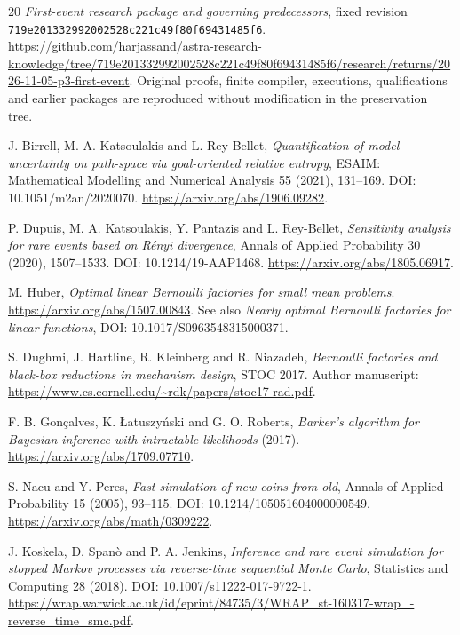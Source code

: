 \documentclass[10pt,a4paper]{article}
\begin{document}
\begin{thebibliography}{20}
\emph{First-event research package and governing predecessors}, fixed revision
\texttt{719e201332992002528c221c49f80f69431485f6}.
\url{https://github.com/harjassand/astra-research-knowledge/tree/719e201332992002528c221c49f80f69431485f6/research/returns/2026-11-05-p3-first-event}.
Original proofs, finite compiler, executions, qualifications and earlier
packages are reproduced without modification in the preservation tree.

J. Birrell, M. A. Katsoulakis and L. Rey-Bellet,
\emph{Quantification of model uncertainty on path-space via goal-oriented
relative entropy}, ESAIM: Mathematical Modelling and Numerical Analysis
55 (2021), 131--169. DOI: 10.1051/m2an/2020070.
\url{https://arxiv.org/abs/1906.09282}.

P. Dupuis, M. A. Katsoulakis, Y. Pantazis and L. Rey-Bellet,
\emph{Sensitivity analysis for rare events based on R\'enyi divergence},
Annals of Applied Probability 30 (2020), 1507--1533.
DOI: 10.1214/19-AAP1468. \url{https://arxiv.org/abs/1805.06917}.

M. Huber, \emph{Optimal linear Bernoulli factories for small mean problems}.
\url{https://arxiv.org/abs/1507.00843}.
See also \emph{Nearly optimal Bernoulli factories for linear functions},
DOI: 10.1017/S0963548315000371.

S. Dughmi, J. Hartline, R. Kleinberg and R. Niazadeh,
\emph{Bernoulli factories and black-box reductions in mechanism design},
STOC 2017. Author manuscript:
\url{https://www.cs.cornell.edu/~rdk/papers/stoc17-rad.pdf}.

F. B. Gon\c{c}alves, K. \L{}atuszy\'nski and G. O. Roberts,
\emph{Barker's algorithm for Bayesian inference with intractable likelihoods}
(2017). \url{https://arxiv.org/abs/1709.07710}.

S. Nacu and Y. Peres, \emph{Fast simulation of new coins from old},
Annals of Applied Probability 15 (2005), 93--115.
DOI: 10.1214/105051604000000549.
\url{https://arxiv.org/abs/math/0309222}.

J. Koskela, D. Span\`o and P. A. Jenkins,
\emph{Inference and rare event simulation for stopped Markov processes via
reverse-time sequential Monte Carlo}, Statistics and Computing 28 (2018).
DOI: 10.1007/s11222-017-9722-1.
\url{https://wrap.warwick.ac.uk/id/eprint/84735/3/WRAP_st-160317-wrap_-reverse_time_smc.pdf}.


\end{thebibliography}
\end{document}
